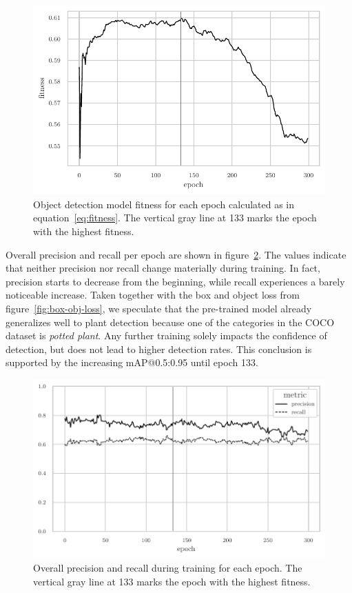 \documentclass[draft,final]{vutinfth} %
\begin{document}
\begin{figure}
  \centering
  \includegraphics{graphics/model_fitness.pdf}
  \caption[Object detection fitness per epoch.]{Object detection model
    fitness for each epoch calculated as in
    equation~\ref{eq:fitness}. The vertical gray line at 133 marks the
    epoch with the highest fitness.}
  \label{fig:fitness}
\end{figure}

Overall precision and recall per epoch are shown in
figure~\ref{fig:prec-rec}. The values indicate that neither precision
nor recall change materially during training. In fact, precision
starts to decrease from the beginning, while recall experiences a
barely noticeable increase. Taken together with the box and object
loss from figure~\ref{fig:box-obj-loss}, we speculate that the
pre-trained model already generalizes well to plant detection because
one of the categories in the COCO~\cite{lin2015} dataset is
\emph{potted plant}. Any further training solely impacts the
confidence of detection, but does not lead to higher detection
rates. This conclusion is supported by the increasing
\textsf{mAP}@0.5:0.95 until epoch 133.

\begin{figure}
  \centering
  \includegraphics{graphics/precision_recall.pdf}
  \caption[Object detection precision and recall during
  training.]{Overall precision and recall during training for each
    epoch. The vertical gray line at 133 marks the epoch with the
    highest fitness.}
  \label{fig:prec-rec}
\end{figure}
\end{document}
